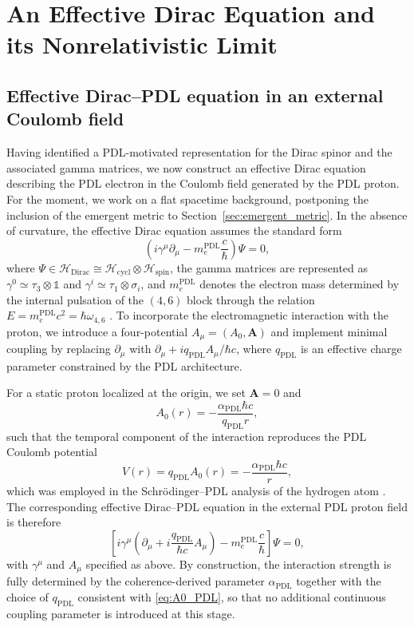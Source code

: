 \documentclass[11pt,a4paper]{article}
\theoremstyle{definition}
\newcommand{\PDL}{\mathrm{PDL}}
\newcommand{\Hspin}{\mathcal{H}_{\mathrm{spin}}}
\newcommand{\Hcycl}{\mathcal{H}_{\mathrm{cycl}}}
\newcommand{\HDirac}{\mathcal{H}_{\mathrm{Dirac}}}
\newcommand{\alphaPDL}{\alpha_{\mathrm{PDL}}}
\begin{document}
\section{An Effective Dirac Equation and its Nonrelativistic Limit}\label{sec:Dirac_effective_NR_limit}

\subsection{Effective Dirac--PDL equation in an external Coulomb field}

Having identified a PDL-motivated representation for the Dirac spinor and the associated gamma matrices, we now construct an effective Dirac equation describing the PDL electron in the Coulomb field generated by the PDL proton. For the moment, we work on a flat spacetime background, postponing the inclusion of the emergent metric to Section~\ref{sec:emergent_metric}. In the absence of curvature, the effective Dirac equation assumes the standard form
\begin{equation}
\left(i\gamma^\mu \partial_\mu - m_e^{\PDL} \frac{c}{\hbar}\right)\Psi = 0,
\label{eq:Dirac_free_PDL}
\end{equation}
where $\Psi \in \HDirac \cong \Hcycl \otimes \Hspin$, the gamma matrices are represented as $\gamma^0 \simeq \tau_3 \otimes \mathbb{1}$ and $\gamma^i \simeq \tau_1 \otimes \sigma_i$, and $m_e^{\PDL}$ denotes the electron mass determined by the internal pulsation of the $(4,6)$ block through the relation $E = m_e^{\PDL} c^2 = \hbar\omega_{4,6}$ \cite{PDL,PDL_Global_Mapping_Structures_Results_Open_Problems}. To incorporate the electromagnetic interaction with the proton, we introduce a four-potential $A_\mu = (A_0,\mathbf{A})$ and implement minimal coupling by replacing $\partial_\mu$ with $\partial_\mu + i q_{\PDL} A_\mu/\hbar c$, where $q_{\PDL}$ is an effective charge parameter constrained by the PDL architecture.

For a static proton localized at the origin, we set $\mathbf{A} = 0$ and
\begin{equation}
A_0(r) = -\frac{\alphaPDL \hbar c}{q_{\PDL} r},
\label{eq:A0_PDL}
\end{equation}
such that the temporal component of the interaction reproduces the PDL Coulomb potential
\begin{equation}
V(r) = q_{\PDL} A_0(r) = -\frac{\alphaPDL \hbar c}{r},
\end{equation}
which was employed in the Schr\"odinger--PDL analysis of the hydrogen atom \cite{Schodinger_PDL,Sketch_derivation_Schroedinger_PDL}. The corresponding effective Dirac--PDL equation in the external PDL proton field is therefore
\begin{equation}
\left[i\gamma^\mu\left(\partial_\mu + i\frac{q_{\PDL}}{\hbar c} A_\mu\right) - m_e^{\PDL} \frac{c}{\hbar}\right]\Psi = 0,
\label{eq:Dirac_PDL_Coulomb}
\end{equation}
with $\gamma^\mu$ and $A_\mu$ specified as above. By construction, the interaction strength is fully determined by the coherence-derived parameter $\alphaPDL$ together with the choice of $q_{\PDL}$ consistent with \eqref{eq:A0_PDL}, so that no additional continuous coupling parameter is introduced at this stage.
\end{document}
